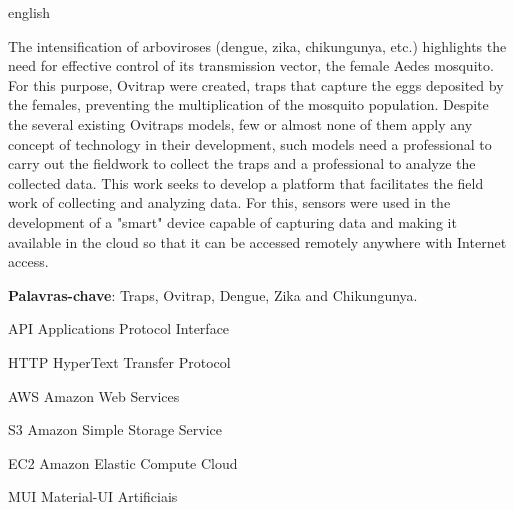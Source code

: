 \documentclass[
	12pt,				%
	openright,			%
	oneside,			%
	a4paper,			%
	chapter=TITLE,		%
	english,			%
	brazil				%
	]{abntex2}
\begin{document}
\begin{resumo}[Abstract]
\begin{otherlanguage*}{english}

The intensification of arboviroses (dengue, zika, chikungunya, etc.) highlights the need for effective control of its transmission vector, 
the female Aedes mosquito. For this purpose, Ovitrap were created, traps that capture the eggs deposited by the females, preventing the 
multiplication of the mosquito population. Despite the several existing Ovitraps models, few or almost none of them apply any concept of 
technology in their development, such models need a professional to carry out the fieldwork to collect the traps and a professional to 
analyze the collected data. This work seeks to develop a platform that facilitates the field work of collecting and analyzing data. For 
this, sensors were used in the development of a "smart" device capable of capturing data and making it available in the cloud so that 
it can be accessed remotely anywhere with Internet access.

\textbf{Palavras-chave}: Traps, Ovitrap, Dengue, Zika and Chikungunya.

\end{otherlanguage*}
\end{resumo}


\listoffigures*
\cleardoublepage

\listoftables*
\cleardoublepage

\begin{siglas}
  \item[API] Applications Protocol Interface
  \item[HTTP] HyperText Transfer Protocol
  \item[AWS] Amazon Web Services
  \item[S3] Amazon Simple Storage Service
  \item[EC2] Amazon Elastic Compute Cloud
  \item[MUI] Material-UI 
Artificiais 
\end{siglas}

\tableofcontents*
\cleardoublepage
\end{document}
